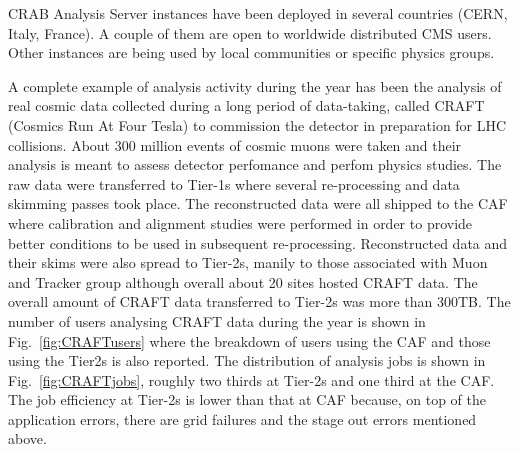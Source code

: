 CRAB Analysis Server instances have been deployed in several countries (CERN, Italy, France). A couple of them are open to worldwide distributed CMS users. Other instances are being used by local communities or specific physics groups.

A complete example of analysis activity during the year has been the analysis 
of real cosmic data collected during a long period of data-taking, called CRAFT (Cosmics Run At Four Tesla) to commission the detector in preparation for LHC collisions. About 300 million events of cosmic muons were taken and their analysis is meant to assess detector perfomance and perfom physics studies.
The raw data were transferred to Tier-1s where several re-processing and data skimming passes took place. The reconstructed data were all shipped to the CAF where calibration and alignment studies were performed in order to provide better conditions to be used in subsequent re-processing. 
Reconstructed data and their skims were also spread to Tier-2s, manily to 
those associated with Muon and Tracker group although overall about 20 sites hosted CRAFT data. The overall amount of CRAFT data transferred to Tier-2s was more than 300TB.
The number of users analysing CRAFT data during the year is shown in Fig.~\ref{fig:CRAFTusers} where the breakdown of users using the CAF and those using the Tier2s is also reported. The distribution of analysis jobs is shown in Fig.~\ref{fig:CRAFTjobs}, roughly two thirds at Tier-2s and one third at the CAF.
The job efficiency at Tier-2s is lower than that at CAF because, on top of the application errors, there are grid failures and the stage out errors mentioned above.
